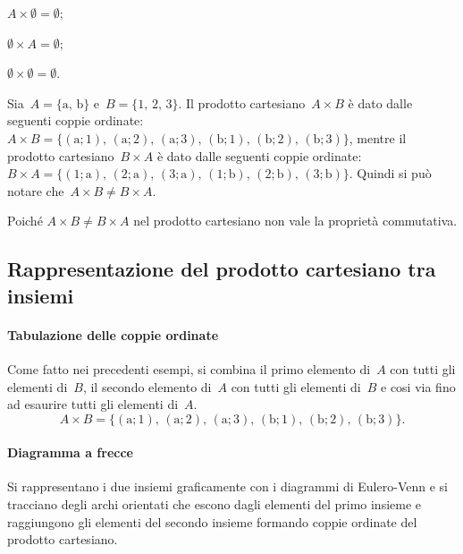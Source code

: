 \begin{enumeratea}
 \item $A\times \emptyset =\emptyset$;
 \item $\emptyset \times A=\emptyset$;
 \item $\emptyset \times \emptyset =\emptyset$.
\end{enumeratea}

\begin{exrig}
 \begin{esempio}
Sia~$A=\{\text{a, b}\}$ e~$B=\{\text{1, 2, 3}\}$. Il prodotto cartesiano~$A\times B$ è dato dalle seguenti coppie ordinate:
$A\times B=\{(\text{a};1)\text{, }(\text{a};2)\text{, }(\text{a};3)\text{, }(\text{b};1)\text{, }(\text{b};2)\text{, }(\text{b};3)\}$, mentre il prodotto cartesiano~$B\times A$
è dato dalle seguenti coppie ordinate:
$B\times A=\{(1;\text{a})\text{, }(2;\text{a})\text{, }(3;\text{a})\text{, }(1;\text{b})\text{, }(2;\text{b})\text{, }(3;\text{b})\}$.
Quindi si può notare che~$A\times B\neq B\times A$.
 \end{esempio}
\end{exrig}

Poiché $A\times B\neq B\times A$ nel prodotto cartesiano non vale la
proprietà commutativa.

\vspazio\ovalbox{\risolvii \ref{ese:7.32}, \ref{ese:7.33}, \ref{ese:7.34}, \ref{ese:7.35}, \ref{ese:7.36}, \ref{ese:7.37}}

\subsection{Rappresentazione del prodotto cartesiano tra insiemi}
\paragraph{Tabulazione delle coppie ordinate}

Come fatto nei precedenti esempi, si combina il primo elemento
di~$A$ con tutti gli elementi di~$B$, il secondo elemento
di~$A$ con tutti gli elementi di~$B$ e cosi via fino ad
esaurire tutti gli elementi di~$A$.
\[A\times B=\{(\text{a};1)\text{, }(\text{a};2)\text{, }(\text{a};3)\text{, }(\text{b};1)\text{, }(\text{b};2)\text{, }(\text{b};3)\}.\]

\paragraph{Diagramma a frecce}
Si rappresentano i due insiemi graficamente
con i diagrammi di Eulero-Venn e si tracciano degli archi orientati che
escono dagli elementi del primo insieme e raggiungono gli elementi del
secondo insieme formando coppie ordinate del prodotto cartesiano.
\begin{center}

\end{center}


